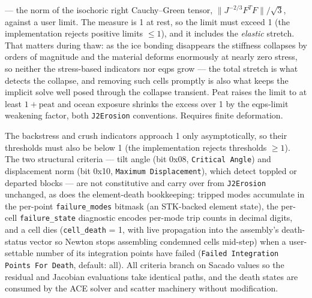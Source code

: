 \documentclass[12pt]{article}
\begin{document}
\begin{itemize}
  --- the norm of the isochoric right Cauchy--Green tensor,
  $\lVert J^{-2/3} F^T\!F \rVert / \sqrt{3}$, against a user limit.
  The measure is 1 at rest, so the limit must exceed 1 (the
  implementation rejects positive limits $\le 1$), and it includes
  the \emph{elastic} stretch. That matters during thaw: as the ice
  bonding disappears the stiffness collapses by orders of magnitude
  and the material deforms enormously at nearly zero stress, so
  neither the stress-based indicators nor eqps grow --- the total
  stretch is what detects the collapse, and removing such cells
  promptly is also what keeps the implicit solve well posed through
  the collapse transient. Peat raises the limit to at least
  $1 + \mathrm{peat}$ and ocean exposure shrinks the excess over 1
  by the eqps-limit weakening factor, both \texttt{J2Erosion}
  conventions. Requires finite deformation.
\end{itemize}
The backstress and crush indicators approach 1 only asymptotically,
so their thresholds must also be below 1 (the implementation rejects
thresholds $\ge 1$). The two structural criteria --- tilt angle
(bit 0x08, \texttt{Critical Angle}) and displacement norm (bit 0x10,
\texttt{Maximum Displacement}), which detect toppled or departed
blocks --- are not constitutive and carry over from
\texttt{J2Erosion} unchanged, as does the element-death bookkeeping:
tripped modes accumulate in the per-point \texttt{failure\_modes}
bitmask (an STK-backed element state), the per-cell
\texttt{failure\_state} diagnostic encodes per-mode trip counts in
decimal digits, and a cell dies (\texttt{cell\_death} = 1, with live
propagation into the assembly's death-status vector so Newton stops
assembling condemned cells mid-step) when a user-settable number of
its integration points have failed
(\texttt{Failed Integration Points For Death}, default: all). All
criteria branch on Sacado values so the residual and Jacobian
evaluations take identical paths, and the death states are consumed
by the ACE solver and scatter machinery without modification.
\end{document}
